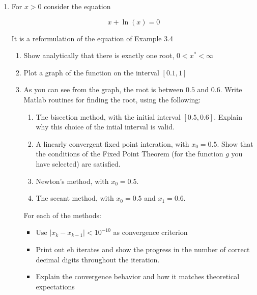\documentclass[12pt]{article}
\newcommand{\abs}[1]{\left| #1 \right|}
\begin{document}
\begin{enumerate}
\item For $x>0$ consider the equation

\[
x + \ln(x) = 0
\]

It is a reformulation of the equation of Example 3.4

\begin{enumerate}
  \item Show analytically that there is exactly one root, $0 < x^{*} < \infty$
  \item Plot a graph of the function on the interval $[0.1, 1]$
  \item As you can see from the graph, the root is between $0.5$ and $0.6$. Write
  {\sc Matlab} routines for finding the root, using the following:
  \begin{enumerate}
    \item The bisection method, with the initial interval $[0.5,0.6]$. Explain
    why this choice of the intial interval is valid.
    \item A linearly convergent fixed point interation, with $x_{0} = 0.5$. Show that
    the conditions of the Fixed Point Theorem (for the function $g$ you have selected)
    are satisfied.
    \item Newton's method, with $x_{0} = 0.5$.
    \item The secant method, with $x_{0} = 0.5$ and $x_{1} = 0.6$.
  \end{enumerate}
  For each of the methods:
  \begin{itemize}
    \item Use $\abs{ x_{k} - x_{k-1}} < 10^{-10}$ as convergence criterion
    \item Print out eh iterates and show the progress in the number of correct decimal
    digits throughout the iteration.
    \item Explain the convergence behavior and how it matches theoretical expectations
  \end{itemize}
\end{enumerate}
\end{enumerate}

\end{document}
